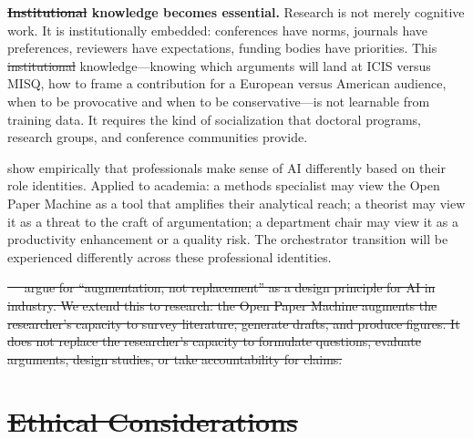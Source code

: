 \documentclass{article}
\providecommand{\DIFaddtex}[1]{{\protect\color{blue}\uwave{#1}}} %
\providecommand{\DIFdeltex}[1]{{\protect\color{red}\sout{#1}}}                      %
\providecommand{\DIFaddbegin}{} %
\providecommand{\DIFaddend}{} %
\providecommand{\DIFdelbegin}{} %
\providecommand{\DIFdelend}{} %
\providecommand{\DIFadd}[1]{\texorpdfstring{\DIFaddtex{#1}}{#1}} %
\providecommand{\DIFdel}[1]{\texorpdfstring{\DIFdeltex{#1}}{}} %
\newcommand{\DIFscaledelfig}{0.5}
\newlength{\DIFdelgraphicswidth} %
\newlength{\DIFdelgraphicsheight} %
\newcommand{\DIFaddincludegraphics}[2][]{{\color{blue}\fbox{\DIFOincludegraphics[#1]{#2}}}} %
\newcommand{\DIFdelincludegraphics}[2][]{%
\sbox{\DIFdelgraphicsbox}{\DIFOincludegraphics[#1]{#2}}%
\settoboxwidth{\DIFdelgraphicswidth}{\DIFdelgraphicsbox} %
\settoboxtotalheight{\DIFdelgraphicsheight}{\DIFdelgraphicsbox} %
\scalebox{\DIFscaledelfig}{%
\parbox[b]{\DIFdelgraphicswidth}{\usebox{\DIFdelgraphicsbox}\\[-\baselineskip] \rule{\DIFdelgraphicswidth}{0em}}\llap{\resizebox{\DIFdelgraphicswidth}{\DIFdelgraphicsheight}{%
\setlength{\unitlength}{\DIFdelgraphicswidth}%
\begin{picture}(1,1)%
\thicklines\linethickness{2pt} %
{\color[rgb]{1,0,0}\put(0,0){\framebox(1,1){}}}%
{\color[rgb]{1,0,0}\put(0,0){\line( 1,1){1}}}%
{\color[rgb]{1,0,0}\put(0,1){\line(1,-1){1}}}%
\end{picture}%
}\hspace*{3pt}}} %
} %
\DeclareRobustCommand{\DIFaddbegin}{\DIFOaddbegin \let\includegraphics\DIFaddincludegraphics} %
\DeclareRobustCommand{\DIFaddend}{\DIFOaddend \let\includegraphics\DIFOincludegraphics} %
\DeclareRobustCommand{\DIFdelbegin}{\DIFOdelbegin \let\includegraphics\DIFdelincludegraphics} %
\DeclareRobustCommand{\DIFdelend}{\DIFOaddend \let\includegraphics\DIFOincludegraphics} %
\begin{document}
\textbf{\DIFdelbegin \DIFdel{Institutional }\DIFdelend \DIFaddbegin \DIFadd{Contextual }\DIFaddend knowledge becomes essential.} Research is not merely cognitive work. It is institutionally embedded: conferences have norms, journals have preferences, reviewers have expectations, funding bodies have priorities. This \DIFdelbegin \DIFdel{institutional }\DIFdelend \DIFaddbegin \DIFadd{contextual }\DIFaddend knowledge---knowing which arguments will land at ICIS versus MISQ, how to frame a contribution for a European versus American audience, when to be provocative and when to be conservative---is not learnable from training data. It requires the kind of socialization that doctoral programs, research groups, and conference communities provide.

\citet{scarbrough2024epistemic} show empirically that professionals make sense of AI differently based on their role identities. Applied to academia: a methods specialist may view the Open Paper Machine as a tool that amplifies their analytical reach; a theorist may view it as a threat to the craft of argumentation; a department chair may view it as a productivity enhancement or a quality risk. The orchestrator transition will be experienced differently across these professional identities.

\DIFdelbegin \DIFdel{\mbox{%
\citet{degallier2022augmentation} }\hskip0pt%
argue for ``augmentation, not replacement'' as a design principle for AI in industry. We extend this to research: the Open Paper Machine augments the researcher's capacity to survey literature, generate drafts, and produce figures. It does not replace the researcher's capacity to formulate questions, evaluate arguments, design studies, or take accountability for claims.
}\DIFdelend %



\DIFdelbegin \section{\DIFdel{Ethical Considerations}}
\addtocounter{section}{-1}%
\DIFdelend %
\end{document}
